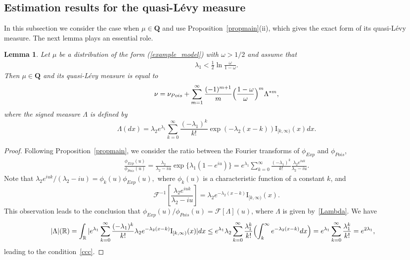\documentclass[numbers,webpdf,imaiai]{ima-authoring-template}%
\theoremstyle{thmstyletwo}%
\newtheorem{lemma}{Lemma}%
\newcommand{\R}{\mathbb{R}}
\newcommand{\F}{\mathcal{F}}
\newcommand{\I}{{\mathrm{I}}}
\newcommand{\Q}{\pmb{Q}}
\newcommand{\w}{\omega}
\newcommand{\e}{e}
\numberwithin{equation}{section}
\begin{document}
\subsection{Estimation results for the quasi-L{\'e}vy measure}

In this subsection we consider the case when $\mu \in \Q$ and use Proposition~\ref{propmain}(ii), which gives the exact form of its quasi-L{\'e}vy measure.  The next lemma plays an essential role. \begin{lemma}\label{example_lemma}
    Let $\mu$ be a distribution of the form (\ref{example_model}) with $\w > 1/2$ and assume that 
\begin{align}\label{ccc}
\lambda_1 < \frac{1}{2} \ln \frac{\w}{1 - \w}.
\end{align} 
Then $\mu \in \Q$ and its quasi-L{\'e}vy measure is equal to 
    \begin{equation*}
        \nu = \nu_{Pois} + \sum_{m = 1}^{\infty} \frac{(-1)^{m + 1}}{m}\Bigl( 
\frac{1-\w}{\w} 
\Bigr)^m\Lambda^{*m},
    \end{equation*}
where the signed measure $\Lambda$ is defined by
\begin{equation}\label{Lambda}
    \Lambda(dx) = \lambda_2e^{\lambda_1} \sum_{k=0}^{\infty} \frac{(-\lambda_1)^k}{k!}\exp(-\lambda_2(x - k)) \I_{[k, \infty)}(x)dx.
\end{equation}
\end{lemma}
\begin{proof}
Following  Proposition~\ref{propmain}, we consider the ratio between the Fourier transforms of  \(\phi_{Exp}\) and \(\phi_{Pois}\), 
\begin{align*}
        \frac{\phi_{Exp}(u)}{\phi_{Pois}(u)} = \frac{\lambda_2}{\lambda_2 - i u}\exp\{\lambda_1 (1 - e^{iu})\} =e^{\lambda_1} \sum_{k=0}^{\infty} \frac{(-\lambda_1)^k}{k!}\frac{ \lambda_2  e^{iuk}}{\lambda_2 - iu}.
    \end{align*}
    Note that \(\lambda_2  e^{iuk}/ (\lambda_2 - iu)= \phi_{k}(u) \phi_{Exp}(u),\)
    where $\phi_k(u)$ is a characteristic function of a constant $k$, and 
    \begin{equation*}
    \F^{-1}[ \frac{\lambda_2e^{iuk}}{\lambda_2 - iu}] = \lambda_2 \e^{-\lambda_2 (x - k)} \I_{[k, \infty)}(x).
    \end{equation*}
    This observation leads to the conclusion that  \(\phi_{Exp}(u)/\phi_{Pois}(u) = \F[\Lambda](u)\), where \(\Lambda\) is given by~\eqref{Lambda}. We have 
    \begin{align*}
    |\Lambda|(\R) &= \int_{\R} |e^{\lambda_1} \sum_{k=0}^{\infty} \frac{(-\lambda_1)^k}{k!}\lambda_2\e^{-\lambda_2(x - k)} \I_{[k, \infty)}(x)|dx 
    \leq e^{\lambda_1} \lambda_2 \sum_{k=0}^{\infty} \frac{\lambda_1^k}{k!} \Bigl( \int_{k}^{\infty}e^{-\lambda_2 (x-k)} dx\Bigr) =  e^{\lambda_1}  \sum_{k=0}^{\infty} \frac{\lambda_1^k}{k!} = e^{2\lambda_1},
    \end{align*}
    leading to the condition~\eqref{ccc}.
\end{proof}
\end{document}

